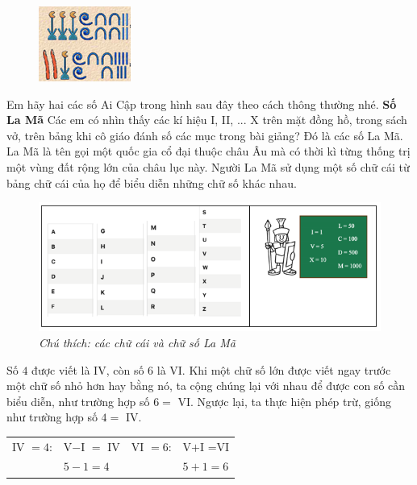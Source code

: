 	\vskip 0.1cm 
	
	\begin{figure}
		\vspace*{-10pt}
		\centering
		\captionsetup{labelformat=empty, justification=centering}
		\includegraphics[scale=1]{13}
		\vspace*{-10pt}
	\end{figure}                          
	Em hãy hai các số Ai Cập trong hình sau đây theo cách thông thường nhé.    
	\vskip 0.1cm
	\textbf{Số La Mã}
	\vskip 0.1cm
	Các em có nhìn thấy các kí hiệu I, II, ... X trên mặt đồng hồ, trong sách vở, trên bảng khi cô giáo đánh số các mục trong bài giảng? Đó là các số La Mã. La Mã là tên gọi một quốc gia cổ đại thuộc châu Âu mà có thời kì từng thống trị một vùng đất rộng lớn của châu lục này. Người La Mã sử dụng một số chữ cái từ bảng chữ cái của họ để biểu diễn những chữ số khác nhau.
	\begin{figure}[H]
		\centering
		\vspace*{-10pt}
		\captionsetup{labelformat= empty, justification=centering}
		\includegraphics[width=1\linewidth]{111}
		\caption{\small\textit{Chú thích: các chữ cái và chữ số La Mã}}
		\vspace*{-10pt}
	\end{figure}
	Số $4$ được viết là IV, còn số $6$ là VI. Khi một chữ số lớn được viết ngay trước  một chữ số nhỏ hơn hay bằng nó, ta cộng chúng lại với nhau để được con số cần biểu diễn, như trường hợp số $6=$ VI. Ngược lại, ta thực hiện phép trừ, giống như trường hợp số $4=$ IV.
	\begin{table}[H]
		\vspace*{-5pt}
		\centering
			\begin{tabular}{|l l|l l|}
			\hline
			IV $=4$:&    V$-$I $=$ IV & VI $=6$:&    V$+$I =VI\\
			&$5-1=4$ & &$5+1=6$\\
			\hline
		\end{tabular}
		\vspace*{-10pt}
	\end{table}
